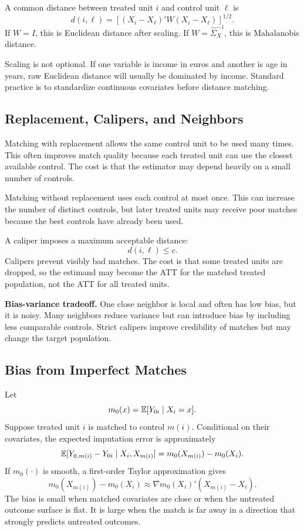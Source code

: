 \begin{defN}
A common distance between treated unit \(i\) and control unit \(\ell\) is
\[
    d(i,\ell)
    =
    \left[(X_i-X_\ell)'W(X_i-X_\ell)\right]^{1/2}.
\]
If \(W=I\), this is Euclidean distance after scaling. If
\(W=\widehat\Sigma_X^{-1}\), this is Mahalanobis distance.
\end{defN}

Scaling is not optional. If one variable is income in euros and another is age
in years, raw Euclidean distance will usually be dominated by income. Standard
practice is to standardize continuous covariates before distance matching.

\subsection{Replacement, Calipers, and Neighbors}

Matching with replacement allows the same control unit to be used many times.
This often improves match quality because each treated unit can use the closest
available control. The cost is that the estimator may depend heavily on a small
number of controls.

Matching without replacement uses each control at most once. This can increase
the number of distinct controls, but later treated units may receive poor
matches because the best controls have already been used.

A caliper imposes a maximum acceptable distance:
\[
    d(i,\ell) \leq c.
\]
Calipers prevent visibly bad matches. The cost is that some treated units are
dropped, so the estimand may become the ATT for the matched treated population,
not the ATT for all treated units.

\begin{boxD}
\textbf{Bias-variance tradeoff.} One close neighbor is local and often has low
bias, but it is noisy. Many neighbors reduce variance but can introduce bias by
including less comparable controls. Strict calipers improve credibility of
matches but may change the target population.
\end{boxD}

\subsection{Bias from Imperfect Matches}

Let
\[
    m_0(x)=\mathbb{E}[Y_{0i}\mid X_i=x].
\]
Suppose treated unit \(i\) is matched to control \(m(i)\). Conditional on their
covariates, the expected imputation error is approximately
\[
    \mathbb{E}[Y_{0,m(i)}-Y_{0i}\mid X_i,X_{m(i)}]
    =
    m_0(X_{m(i)})-m_0(X_i).
\]
If \(m_0(\cdot)\) is smooth, a first-order Taylor approximation gives
\[
    m_0(X_{m(i)})-m_0(X_i)
    \approx
    \nabla m_0(X_i)'(X_{m(i)}-X_i).
\]
The bias is small when matched covariates are close or when the untreated
outcome surface is flat. It is large when the match is far away in a direction
that strongly predicts untreated outcomes.

